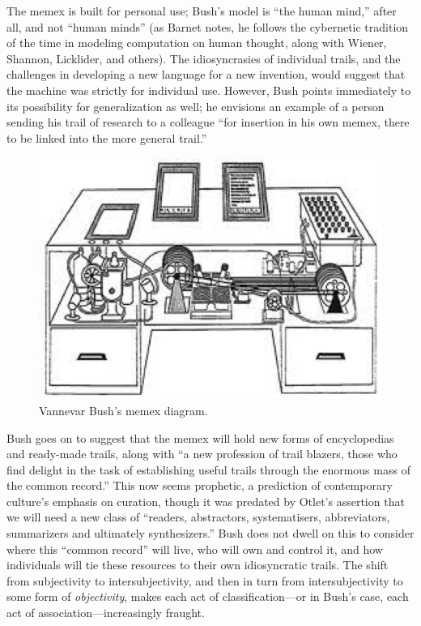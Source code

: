 The memex is built for personal use; Bush's model is ``the human mind,'' after all, and not ``human minds'' (as Barnet notes, he follows the cybernetic tradition of the time in modeling computation on human thought, along with Wiener, Shannon, Licklider, and others).\autocite{barnet_technical_2008} The idiosyncrasies of individual trails, and the challenges in developing a new language for a new invention, would suggest that the machine was strictly for individual use. However, Bush points immediately to its possibility for generalization as well; he envisions an example of a person sending his trail of research to a colleague ``for insertion in his own memex, there to be linked into the more general trail.''\autocite{bush_as_1945}

\begin{figure}[ht]
\centering
\includegraphics[width=350pt]{figures/memex}
\caption{Vannevar Bush's memex diagram.}
\label{fig:memex}
\end{figure}

Bush goes on to suggest that the memex will hold new forms of encyclopedias and ready-made trails, along with ``a new profession of trail blazers, those who find delight in the task of establishing useful trails through the enormous mass of the common record.''\autocite{bush_as_1945} This now seems prophetic, a prediction of contemporary culture's emphasis on curation, though it was predated by Otlet's assertion that we will need a new class of ``readers, abstractors, systematisers, abbreviators, summarizers and ultimately synthesizers.''\autocite[23]{reagle_good_2010} Bush does not dwell on this to consider where this ``common record'' will live, who will own and control it, and how individuals will tie these resources to their own idiosyncratic trails. The shift from subjectivity to intersubjectivity, and then in turn from intersubjectivity to some form of \emph{objectivity}, makes each act of classification---or in Bush's case, each act of association---increasingly fraught.

